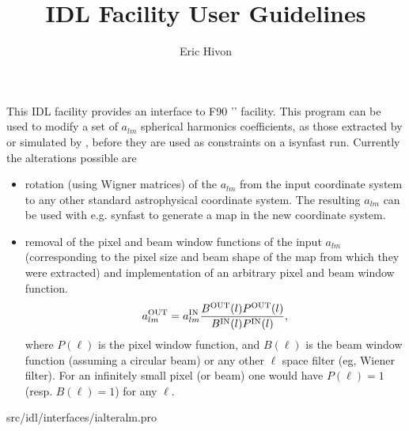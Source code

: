 
\sloppy

\title{\healpix IDL Facility User Guidelines}
 \section[ialteralm]{ }
\label{idl:ialteralm}
\author{Eric Hivon}

\begin{facility}
{This IDL facility provides an interface to F90 '' facility. 
This program can be used to modify a set of $a_{lm}$ spherical harmonics
  coefficients, as those extracted by  or 
  simulated by , before
  they are used as constraints on a isynfast run. Currently the alterations
  possible are %
\begin{itemize}
    \item rotation (using Wigner matrices) of the $a_{lm}$ from the input
    coordinate system to any other standard astrophysical coordinate system. The
    resulting $a_{lm}$ can be used with e.g. synfast to generate a map in the
    new coordinate system.
    \item removal of the pixel and beam window functions of the input
  $a_{lm}$ (corresponding to the pixel size and beam shape of the map from which
  they were extracted) and implementation of an arbitrary pixel and beam window
  function. 
\begin{equation} a_{\ell m}^{\rm OUT} = a_{\ell m}^{\rm IN} \frac{B^{\rm OUT}(\ell) P^{\rm 
 OUT}(\ell)}{B^{\rm IN}(\ell) P^{\rm IN}(\ell)}, \label{eq:alteralm} \end{equation}
where $P(\ell)$ is the pixel window function, and $B(\ell)$ is the beam window
 function (assuming a circular beam) or any other $\ell$ space filter (eg,
 Wiener filter). For an infinitely small pixel (or beam) one would have $P(\ell) =
 1$ (resp. $B(\ell) = 1$) for any $\ell$.
\end{itemize}
}
{src/idl/interfaces/ialteralm.pro}
\end{facility}

